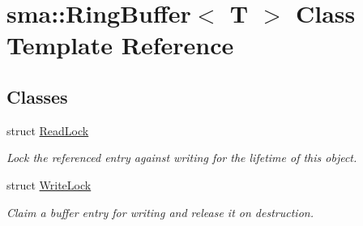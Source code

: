 \hypertarget{classsma_1_1RingBuffer}{\section{sma\-:\-:Ring\-Buffer$<$ T $>$ Class Template Reference}
\label{classsma_1_1RingBuffer}
}
\subsection*{Classes}
\begin{DoxyCompactItemize}
\item 
struct \hyperlink{structsma_1_1RingBuffer_1_1ReadLock}{Read\-Lock}
\begin{DoxyCompactList}\small\item\em Lock the referenced entry against writing for the lifetime of this object. \end{DoxyCompactList}\item 
struct \hyperlink{structsma_1_1RingBuffer_1_1WriteLock}{Write\-Lock}
\begin{DoxyCompactList}\small\item\em Claim a buffer entry for writing and release it on destruction. \end{DoxyCompactList}\end{DoxyCompactItemize}
